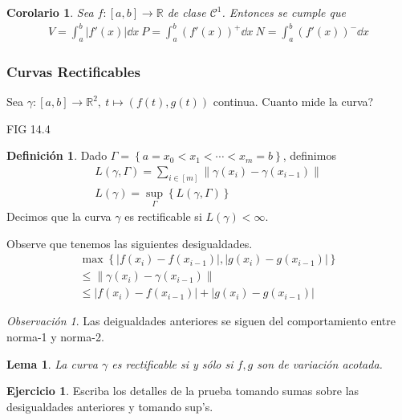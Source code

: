 \documentclass[12pt]{article}
\theoremstyle{plain}
\newtheorem{Lem}[Th]{Lema}             %
\newtheorem{Cor}[Th]{Corolario}        %
\theoremstyle{definition}
\newtheorem{Def}[Th]{Definición}       %
\newtheorem{Ej}[Th]{Ejercicio}
\theoremstyle{remark}
\newtheorem{Rmk}[Th]{Observación}      %
\numberwithin{equation}{section}
\newcommand{\bR}{\mathbb{R}}        %
\newcommand{\cC}{\mathcal{C}}       %
\renewcommand{\leq}{\leqslant}      %
\renewcommand{\:}{\colon}           %
\newcommand{\conj}[1]{\left\lbrace#1\right\rbrace}
\newcommand{\bonj}[1]{\left\lbrack#1\right\rbrack}
\newcommand{\nm}[1]{\left\|#1\right\|} %
\begin{document}
\begin{multicols}{2}
\begin{Cor}
  Sea $f\:\bonj{a,b}\to\bR$ de clase $\cC^1$. Entonces se cumple que
  \begin{gather*}
    V=\int_{a}^{b}|f'(x)|\dd x\
    P=\int_{a}^{b}(f'(x))^+\dd x\
    N=\int_{a}^{b}(f'(x))^-\dd x
  \end{gather*}
\end{Cor}

\subsubsection*{Curvas Rectificables}

Sea $\gamma\:\bonj{a,b}\to\bR^2,\ t\mapsto(f(t),g(t))$ continua. Cuanto mide la curva?\par
FIG 14.4\par
\begin{Def}
  Dado $\Gamma=\conj{a=x_0<x_1<\cdots<x_m=b}$, definimos
 \begin{gather*}
   L(\gamma,\Gamma)=\sum_{i\in\bonj{m}}\nm{\gamma(x_i)-\gamma(x_{i-1})} \\
 L(\gamma)=\sup_\Gamma\conj{L(\gamma,\Gamma)}
 \end{gather*}
 Decimos que la curva $\gamma$ es rectificable si $L(\gamma)<\infty$.
\end{Def}

Observe que tenemos las siguientes desigualdades.
\begin{gather*}
  \max\conj{|f(x_i)-f(x_{i-1})|,|g(x_i)-g(x_{i-1})|} \\
  \leq \nm{\gamma(x_i)-\gamma(x_{i-1})}\\
  \leq |f(x_i)-f(x_{i-1})|+|g(x_i)-g(x_{i-1})|
\end{gather*}

\begin{Rmk}
  Las deigualdades anteriores se siguen del comportamiento entre norma-1 y norma-2.
\end{Rmk}

\begin{Lem}
  La curva $\gamma$ es rectificable si y sólo si $f,g$ son de variación acotada.
\end{Lem}

\begin{Ej}
  Escriba los detalles de la prueba tomando sumas sobre las desigualdades anteriores y tomando sup's.
\end{Ej}


\end{multicols}
\end{document}
